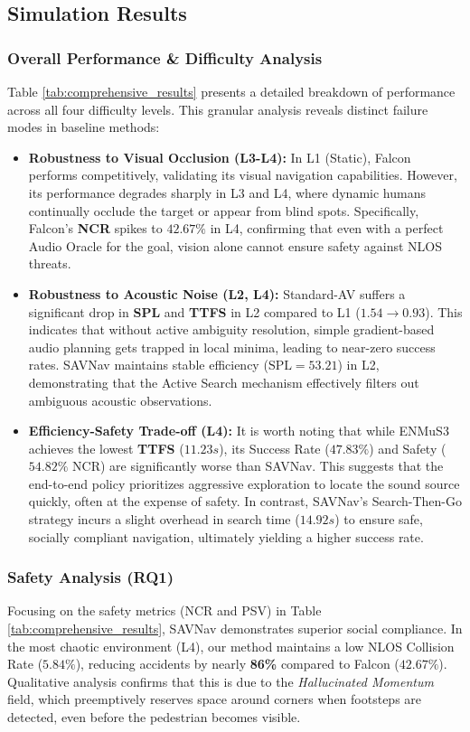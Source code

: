 \subsection{Simulation Results}

\subsubsection{Overall Performance \& Difficulty Analysis}
Table \ref{tab:comprehensive_results} presents a detailed breakdown of performance across all four difficulty levels. This granular analysis reveals distinct failure modes in baseline methods:

\begin{itemize}
    \item \textbf{Robustness to Visual Occlusion (L3-L4):} In L1 (Static), Falcon performs competitively, validating its visual navigation capabilities. However, its performance degrades sharply in L3 and L4, where dynamic humans continually occlude the target or appear from blind spots. Specifically, Falcon's \textbf{NCR} spikes to $42.67\%$ in L4, confirming that even with a perfect Audio Oracle for the goal, vision alone cannot ensure safety against NLOS threats.
    \item \textbf{Robustness to Acoustic Noise (L2, L4):} Standard-AV suffers a significant drop in \textbf{SPL} and \textbf{TTFS} in L2 compared to L1 ($1.54 \to 0.93$). This indicates that without active ambiguity resolution, simple gradient-based audio planning gets trapped in local minima, leading to near-zero success rates. SAVNav maintains stable efficiency ($\text{SPL}=53.21$) in L2, demonstrating that the Active Search mechanism effectively filters out ambiguous acoustic observations.
    \item \textbf{Efficiency-Safety Trade-off (L4):} It is worth noting that while ENMuS3 achieves the lowest \textbf{TTFS} ($11.23s$), its Success Rate ($47.83\%$) and Safety ($54.82\%$ NCR) are significantly worse than SAVNav. This suggests that the end-to-end policy prioritizes aggressive exploration to locate the sound source quickly, often at the expense of safety. In contrast, SAVNav's Search-Then-Go strategy incurs a slight overhead in search time ($14.92s$) to ensure safe, socially compliant navigation, ultimately yielding a higher success rate.
\end{itemize}

\subsubsection{Safety Analysis (RQ1)}
Focusing on the safety metrics (NCR and PSV) in Table \ref{tab:comprehensive_results}, SAVNav demonstrates superior social compliance. In the most chaotic environment (L4), our method maintains a low NLOS Collision Rate ($5.84\%$), reducing accidents by nearly \textbf{86\%} compared to Falcon ($42.67\%$). Qualitative analysis confirms that this is due to the \textit{Hallucinated Momentum} field, which preemptively reserves space around corners when footsteps are detected, even before the pedestrian becomes visible.


